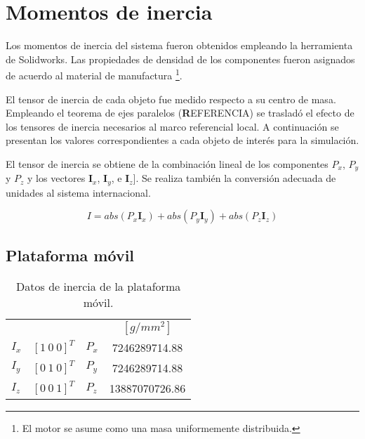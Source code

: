 \section{Momentos de inercia}

Los momentos de inercia del sistema fueron obtenidos
empleando la herramienta de Solidworks. 
Las propiedades de densidad de los componentes 
fueron asignados de acuerdo al material de manufactura
\footnote{El motor se asume como una masa uniformemente distribuida.}.

El tensor de inercia de cada objeto fue medido respecto a su centro de masa.
Empleando el teorema de ejes paralelos (\textbf REFERENCIA) se trasladó el efecto de los tensores de inercia necesarios al marco referencial local.
A continuación se presentan los valores correspondientes a cada objeto de interés para la simulación.

El tensor de inercia se obtiene de la combinación lineal 
de los componentes $P_x$, $P_y$ y $P_z$ y los vectores $\mathbf I_x$, $\mathbf I_y$, e $\mathbf I_z]$.
Se realiza también la conversión adecuada de unidades al
sistema internacional.

\begin{equation*}
 I = abs(P_x \mathbf I_x) + abs(P_y \mathbf I_y) +abs(P_z \mathbf I_z)
\end{equation*}

\subsection{Plataforma móvil}

% 

\begin{table}[hb!]
 \begin{center}
\begin{tabular}{lclc}
 & & & $[g/mm^2]$\\
 $ I_x $ & $ [1 \ 0 \ 0]^T $ & $ P_x $ & 7246289714.88\\
 $ I_y $ & $ [0 \ 1 \ 0]^T $ & $ P_y $ & 7246289714.88\\
 $ I_z $ & $ [0 \ 0 \ 1]^T $ & $ P_z $ & 13887070726.86
\end{tabular}
\end{center}
\caption{Datos de inercia de la plataforma móvil.}
\label{tab: inertia table platform}
\end{table}


